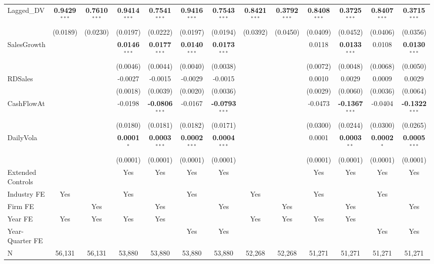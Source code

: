 \documentclass[11pt,a4paper]{article}
\begin{document}
\begin{table}[htbp]
\begin{tabular}{lcccccccccccc}
Lagged\_DV & \textbf{0.9429}$^{***}$ & \textbf{0.7610}$^{***}$ & \textbf{0.9414}$^{***}$ & \textbf{0.7541}$^{***}$ & \textbf{0.9416}$^{***}$ & \textbf{0.7543}$^{***}$ & \textbf{0.8421}$^{***}$ & \textbf{0.3792}$^{***}$ & \textbf{0.8408}$^{***}$ & \textbf{0.3725}$^{***}$ & \textbf{0.8407}$^{***}$ & \textbf{0.3715}$^{***}$ \\
 & (0.0189) & (0.0230) & (0.0197) & (0.0222) & (0.0197) & (0.0194) & (0.0392) & (0.0450) & (0.0409) & (0.0452) & (0.0406) & (0.0356) \\
SalesGrowth &  &  & \textbf{0.0146}$^{***}$ & \textbf{0.0177}$^{***}$ & \textbf{0.0140}$^{***}$ & \textbf{0.0173}$^{***}$ &  &  & 0.0118 & \textbf{0.0133}$^{***}$ & 0.0108 & \textbf{0.0130}$^{***}$ \\
 &  &  & (0.0046) & (0.0044) & (0.0040) & (0.0038) &  &  & (0.0072) & (0.0048) & (0.0068) & (0.0050) \\
RDSales &  &  & -0.0027 & -0.0015 & -0.0029 & -0.0015 &  &  & 0.0010 & 0.0029 & 0.0009 & 0.0029 \\
 &  &  & (0.0018) & (0.0039) & (0.0020) & (0.0036) &  &  & (0.0029) & (0.0060) & (0.0036) & (0.0064) \\
CashFlowAt &  &  & -0.0198 & \textbf{-0.0806}$^{***}$ & -0.0167 & \textbf{-0.0793}$^{***}$ &  &  & -0.0473 & \textbf{-0.1367}$^{***}$ & -0.0404 & \textbf{-0.1322}$^{***}$ \\
 &  &  & (0.0180) & (0.0181) & (0.0182) & (0.0171) &  &  & (0.0300) & (0.0244) & (0.0300) & (0.0265) \\
DailyVola &  &  & \textbf{0.0001}$^{*}$ & \textbf{0.0003}$^{***}$ & \textbf{0.0002}$^{***}$ & \textbf{0.0004}$^{***}$ &  &  & 0.0001 & \textbf{0.0003}$^{**}$ & \textbf{0.0002}$^{*}$ & \textbf{0.0005}$^{***}$ \\
 &  &  & (0.0001) & (0.0001) & (0.0001) & (0.0001) &  &  & (0.0001) & (0.0001) & (0.0001) & (0.0001) \\
\midrule
Extended Controls &  &  & Yes & Yes & Yes & Yes &  &  & Yes & Yes & Yes & Yes \\
Industry FE & Yes &  & Yes &  & Yes &  & Yes &  & Yes &  & Yes &  \\
Firm FE &  & Yes &  & Yes &  & Yes &  & Yes &  & Yes &  & Yes \\
Year FE & Yes & Yes & Yes & Yes &  &  & Yes & Yes & Yes & Yes &  &  \\
Year-Quarter FE &  &  &  &  & Yes & Yes &  &  &  &  & Yes & Yes \\
\midrule
N & 56,131 & 56,131 & 53,880 & 53,880 & 53,880 & 53,880 & 52,268 & 52,268 & 51,271 & 51,271 & 51,271 & 51,271 \\

\end{tabular}
\end{table}
\end{document}
